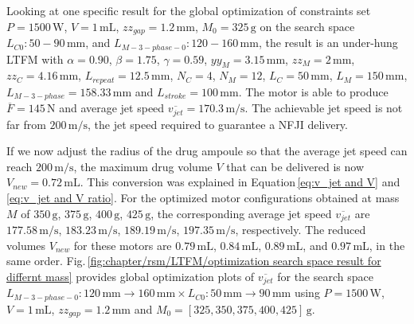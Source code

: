             
            Looking at one specific result for the global optimization of constraints set $P=1500\,\mathrm{W}$, $V=1\,\mathrm{mL}$, $zz_{gap}=1.2\,\mathrm{mm}$, $M_0=325\,\mathrm{g}$ on the search space $L_{C0}:50-90\,\mathrm{mm}$, and $L_{M-3-phase-0}:120-160\,\mathrm{mm}$, the result is an under-hung \acs{LTFM} with $\alpha=0.90$, $\beta=1.75$, $\gamma=0.59$, $yy_M=3.15\,\mathrm{mm}$, $zz_M=2\,\mathrm{mm}$, $zz_C=4.16\,\mathrm{mm}$, $L_{repeat}=12.5\,\mathrm{mm}$, $N_C=4$, $N_M=12$, $L_C=50\,\mathrm{mm}$, $L_M=150\,\mathrm{mm}$, $L_{M-3-phase}=158.33\,\mathrm{mm}$ and $L_{stroke}=100\,\mathrm{mm}$. The motor is able to produce $\overline{F} = 145\,\mathrm{N}$ and average jet speed $\overline{v_{jet}}=170.3\,\mathrm{m/s}$. The achievable jet speed is not far from $200\,\mathrm{m/s}$, the jet speed required to guarantee a \acs{NFJI} delivery. 
            
            
            If we now adjust the radius of the drug ampoule so that the average jet speed can reach $200\,\mathrm{m/s}$, the maximum drug volume $V$ that can be delivered is now $V_{new}=0.72\,\mathrm{mL}$. This conversion was explained in Equation\,\ref{eq:v_jet and V} and \ref{eq:v_jet and V ratio}. For the optimized motor configurations obtained at mass $M$ of $350\,\mathrm{g}$, $375\,\mathrm{g}$, $400\,\mathrm{g}$, $425\,\mathrm{g}$, the corresponding average jet speed $\overline{v_{jet}}$ are $177.58\,\mathrm{m/s}$, $183.23\,\mathrm{m/s}$, $189.19\,\mathrm{m/s}$, $197.35\,\mathrm{m/s}$, respectively. The reduced volumes $V_{new}$ for these motors are $0.79\,\mathrm{mL}$, $0.84\,\mathrm{mL}$, $0.89\,\mathrm{mL}$, and $0.97\,\mathrm{mL}$, in the same order. Fig.\,\ref{fig:chapter/rsm/LTFM/optimization search space result for differnt mass} provides global optimization plots of $\overline{v_{jet}}$ for the search space $L_{M-3-phase-0}:120\,\mathrm{mm}\rightarrow 160\,\mathrm{mm} \times L_{C0}:50\,\mathrm{mm}\rightarrow 90\,\mathrm{mm}$ using $P=1500\,\mathrm{W}$, $V=1\,\mathrm{mL}$, $zz_{gap}=1.2\,\mathrm{mm}$ and $M_0=[325,350,375,400,425]\,\mathrm{g}$. 
        
